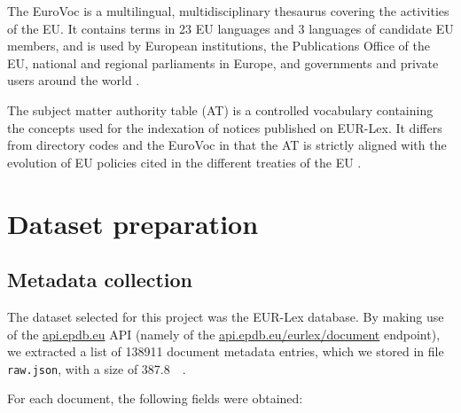 \documentclass[sigconf, authorversion]{acmart}
\begin{document}
The EuroVoc is a multilingual, multidisciplinary thesaurus covering the activities of the EU. It contains terms in 23 EU languages and 3 languages of candidate EU members, and is used by European institutions, the Publications Office of the EU, national and regional parliaments in Europe, and governments and private users around the world \cite{eurovoc}.

The subject matter authority table (AT) is a controlled vocabulary containing the concepts used for the indexation of notices published on EUR-Lex. It differs from directory codes and the EuroVoc in that the AT is strictly aligned with the evolution of EU policies cited in the different treaties of the EU \cite{subject-matter-at}.

\section{Dataset preparation}

\subsection{Metadata collection} \label{ssec:metadata-collection}

The dataset selected for this project was the EUR-Lex database. By making use of the \url{api.epdb.eu} API (namely of the \url{api.epdb.eu/eurlex/document} endpoint), we extracted a list of \SI{138911}{} document metadata entries, which we stored in file \texttt{raw.json}, with a size of \SI{387.8}{\mega\byte}.

For each document, the following fields were obtained:
\end{document}
